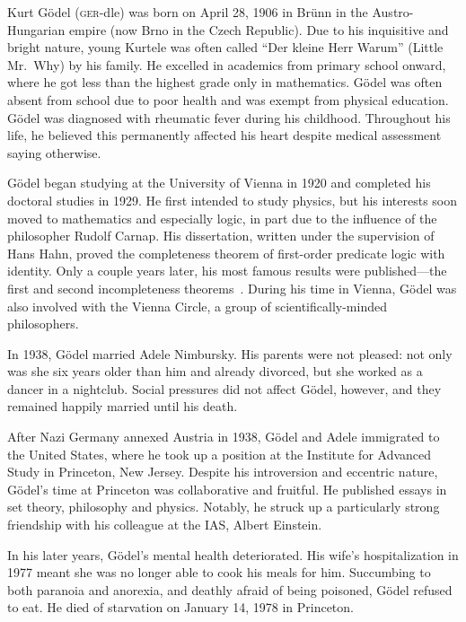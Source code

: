 \documentclass[../../../include/open-logic-section]{subfiles}
\begin{document}



Kurt G{\"o}del (\textsc{ger}-dle) was born on April 28, 1906 in
Br{\"u}nn in the Austro-Hungarian empire (now Brno in the Czech
Republic). Due to his inquisitive and bright nature, young Kurtele was
often called ``Der kleine Herr Warum'' (Little Mr.~Why) by his
family. He excelled in academics from primary school onward, where he
got less than the highest grade only in mathematics. G{\"o}del was
often absent from school due to poor health and was exempt from
physical education. G{\"o}del was diagnosed with rheumatic fever
during his childhood. Throughout his life, he believed this
permanently affected his heart despite medical assessment saying
otherwise.

G{\"o}del began studying at the University of Vienna in 1920 and
completed his doctoral studies in 1929. He first intended to study
physics, but his interests soon moved to mathematics and especially
logic, in part due to the influence of the philosopher Rudolf
Carnap. His dissertation, written under the supervision of Hans Hahn,
proved the completeness theorem of first-order predicate logic with
identity. Only a couple years later, his most famous results were
published---the first and second incompleteness
theorems~\citep{Godel1931}. During his time in Vienna, G{\"o}del was
also involved with the Vienna Circle, a group of scientifically-minded
philosophers.

In 1938, G\"odel married Adele Nimbursky. His parents were not
pleased: not only was she six years older than him and already
divorced, but she worked as a dancer in a nightclub. 
Social pressures did not affect G{\"o}del, however,
and they remained happily married until his death.

After Nazi Germany annexed Austria in 1938, G{\"o}del and Adele
immigrated to the United States, where he took up a position at the
Institute for Advanced Study in Princeton, New Jersey. Despite his
introversion and eccentric nature, G{\"o}del's time at Princeton was
collaborative and fruitful.  He published essays in set theory,
philosophy and physics. Notably, he struck up a particularly strong
friendship with his colleague at the IAS, Albert Einstein.

In his later years, G{\"o}del's mental health deteriorated. His wife's
hospitalization in 1977 meant she was no longer able to cook his meals
for him. Succumbing to both paranoia and anorexia, and deathly afraid
of being poisoned, G{\"o}del refused to eat. He died of starvation on
January 14, 1978 in Princeton.
\end{document}
